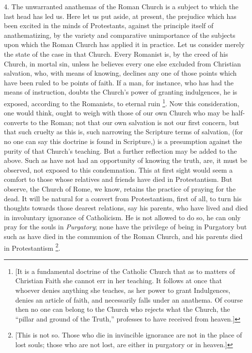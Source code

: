 4. The unwarranted anathemas of the Roman Church
is a subject to which the last head has led us. Here let us put
aside, at present, the prejudice which has been excited in the minds
of Protestants, against the principle itself of anathematizing, by the
variety and comparative unimportance of the subjects upon which the
Roman Church has applied it in practice. Let us consider merely the
state of the case in that Church. Every Romanist is, by the creed of
his Church, in mortal sin, unless he believes every one else excluded
from Christian salvation, who, with means of knowing, declines any one
of those points which have been ruled to be points of faith. If a man,
for instance, who has had the means of instruction, doubts the Church's
power of granting indulgences, he is exposed, according to the
Romanists, to eternal ruin \footnote{[It is a fundamental doctrine of the Catholic Church that as to
matters of Christian Faith she cannot err in her teaching. It follows
at once that whoever denies anything she teaches, as her power to
grant Indulgences, denies an article of faith, and necessarily falls
under an anathema. Of course then no one can belong to the Church who
rejects what the Church, the ``pillar and ground of the Truth,''
professes to have received from heaven.]}.
Now this consideration, one would think, ought to weigh with those of
our own Church who may be half-converts to the Roman; not that our own
salvation is not our first concern, but that such cruelty as this is,
such narrowing the Scripture terms of salvation, (for no one can say
this doctrine is found in Scripture,) is a presumption against the
purity of that Church's teaching. But a further reflection may be
added to the above. Such as have not had an opportunity of knowing the
truth, are, it must be observed, not exposed to this condemnation.
This at first sight would seem a comfort to those whose relatives and
friends have died in Protestantism. But observe, the Church of Rome,
we know, retains the practice of praying for the dead. It will be
natural for a convert from Protestantism, first of all, to turn his
thoughts towards those dearest relations, say his parents, who
have lived and died in involuntary ignorance of Catholicism. He is not
allowed to do so, he can only pray for the souls in \emph{Purgatory}; none
have the privilege of being in Purgatory but such as have died in the
communion of the Roman Church, and his parents died in Protestantism \footnote{[This is not so. Those who die in invincible ignorance are not in the
place of lost souls; those who are not lost, are either in purgatory
or in heaven.]}.

